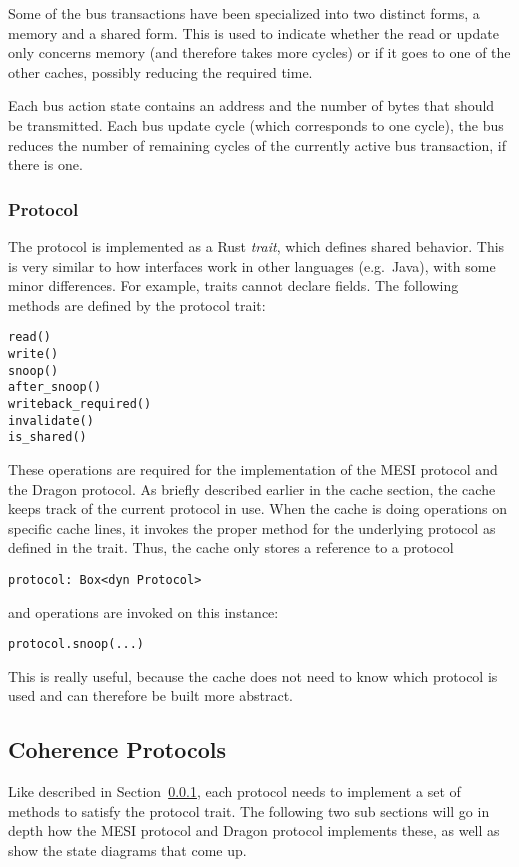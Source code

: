 Some of the bus transactions have been specialized into two distinct forms, a memory and a shared
form. This is used to indicate whether the read or update only concerns memory (and therefore takes
more cycles) or if it goes to one of the other caches, possibly reducing the required time.

Each bus action state contains an address and the number of bytes that should be transmitted. Each
bus update cycle (which corresponds to one cycle), the bus reduces the number of remaining cycles
of the currently active bus transaction, if there is one.

\subsubsection{Protocol}\label{sec:sub_protocol}

The protocol is implemented as a Rust \emph{trait}, which defines shared behavior. This is very
similar to how interfaces work in other languages (e.g.\ Java), with some minor differences. For
example, traits cannot declare fields. The following methods are defined by the protocol trait:
\begin{lstlisting}
read()
write()
snoop()
after_snoop()
writeback_required()
invalidate()
is_shared()
\end{lstlisting}
These operations are required for the implementation of the MESI protocol and the Dragon protocol.
As briefly described earlier in the cache section, the cache keeps track of the current protocol in
use. When the cache is doing operations on specific cache lines, it invokes the proper method for
the underlying protocol as defined in the trait. Thus, the cache only stores a reference to a protocol
\begin{lstlisting}
protocol: Box<dyn Protocol>
\end{lstlisting}
and operations are invoked on this instance:
\begin{lstlisting}
protocol.snoop(...)
\end{lstlisting}

This is really useful, because the cache does not need to know which protocol is used and can
therefore be built more abstract.

\subsection{Coherence Protocols}
Like described in Section~\ref{sec:sub_protocol}, each protocol needs to implement a set of methods
to satisfy the protocol trait. The following two sub sections will go in depth how the MESI protocol and
Dragon protocol implements these, as well as show the state diagrams that come up.

